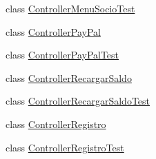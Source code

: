 \begin{DoxyCompactItemize}
\item 
class \mbox{\hyperlink{classes_1_1deusto_1_1client_1_1controllers_1_1_controller_menu_socio_test}{Controller\+Menu\+Socio\+Test}}
\item 
class \mbox{\hyperlink{classes_1_1deusto_1_1client_1_1controllers_1_1_controller_pay_pal}{Controller\+Pay\+Pal}}
\item 
class \mbox{\hyperlink{classes_1_1deusto_1_1client_1_1controllers_1_1_controller_pay_pal_test}{Controller\+Pay\+Pal\+Test}}
\item 
class \mbox{\hyperlink{classes_1_1deusto_1_1client_1_1controllers_1_1_controller_recargar_saldo}{Controller\+Recargar\+Saldo}}
\item 
class \mbox{\hyperlink{classes_1_1deusto_1_1client_1_1controllers_1_1_controller_recargar_saldo_test}{Controller\+Recargar\+Saldo\+Test}}
\item 
class \mbox{\hyperlink{classes_1_1deusto_1_1client_1_1controllers_1_1_controller_registro}{Controller\+Registro}}
\item 
class \mbox{\hyperlink{classes_1_1deusto_1_1client_1_1controllers_1_1_controller_registro_test}{Controller\+Registro\+Test}}
\end{DoxyCompactItemize}

